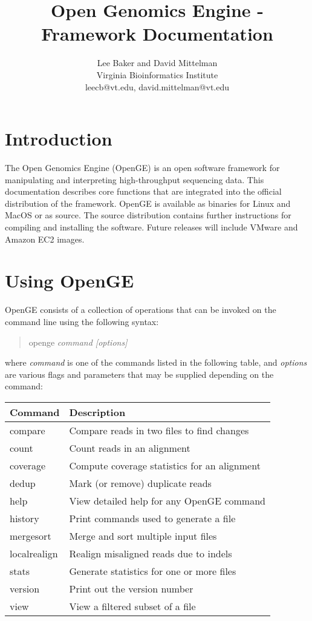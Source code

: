 \documentclass[11pt]{article}
\newcommand {\cmd}[1] {\begin{quote}#1\end{quote}}
\begin{document}
\title{Open Genomics Engine - Framework Documentation}
\author{Lee Baker and David Mittelman\\
Virginia Bioinformatics Institute \\
leecb@vt.edu, david.mittelman@vt.edu}
\maketitle

\section {Introduction}
The Open Genomics Engine (OpenGE) is an open software framework for manipulating and interpreting high-throughput sequencing data. This documentation describes core functions that are integrated into the official distribution of the framework. OpenGE is available as binaries for Linux and MacOS or as source. The source distribution contains further instructions for compiling and installing the software. Future releases will include VMware and Amazon EC2 images.
\section {Using OpenGE}
OpenGE consists of a collection of operations that can be invoked on the command line using the following syntax:

\cmd{openge \textit{command [options]}}

where \textit{command} is one of the commands listed in the following table, and \textit{options} are various flags and parameters that may be supplied depending on the command:

\begin{center}
\begin{tabular}{lp{3.5in}}
\hline
Command&Description\\ \hline
compare&Compare reads in two files to find changes\\
count&Count reads in an alignment\\
coverage&Compute coverage statistics for an alignment\\
dedup&Mark (or remove) duplicate reads\\
help&View detailed help for any OpenGE command\\
history&Print commands used to generate a file\\
mergesort&Merge and sort multiple input files\\
localrealign&Realign misaligned reads due to indels\\
stats&Generate statistics for one or more files\\
version&Print out the version number\\
view&View a filtered subset of a file\\
\end{tabular}
\end{center}
\end{document}
